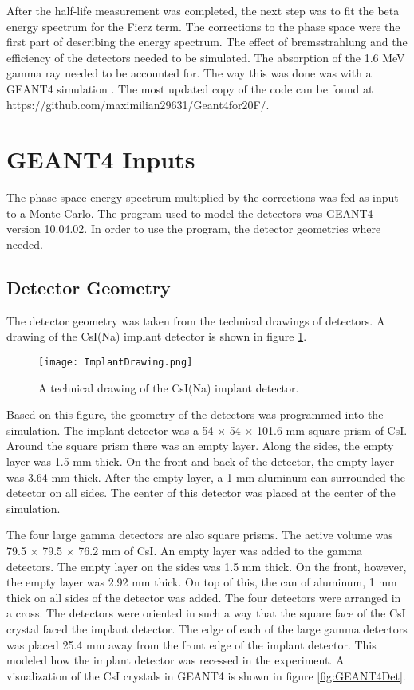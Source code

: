 \documentclass[../MaxHughesThesis.tex]{subfiles}
\begin{document}
After the half-life measurement was completed, the next step was to fit the beta energy spectrum for the Fierz term. 
The corrections to the phase space were the first part of describing the energy spectrum.  
The effect of bremsstrahlung and the efficiency of the detectors needed to be simulated.
The absorption of the 1.6 MeV gamma ray needed to be accounted for. 
The way this was done was with a GEANT4 simulation \cite{Ago03}.
The most updated copy of the code can be found at https://github.com/maximilian29631/Geant4for20F/.


\section{GEANT4 Inputs}
The phase space energy spectrum multiplied by the corrections was fed as input to a Monte Carlo.
The program used to model the detectors was GEANT4 version 10.04.02.
In order to use the program, the detector geometries where needed.

\subsection{Detector Geometry}
The detector geometry was taken from the technical drawings of detectors. 
A drawing of the CsI(Na) implant detector is shown in figure \ref{fig:ImplantTech}.
\begin{figure}[!htb]
	\centerline{\texttt{[image: ImplantDrawing.png]}}
	\caption{A technical drawing of the CsI(Na) implant detector.}
	\label{fig:ImplantTech}
\end{figure}
Based on this figure, the geometry of the detectors was programmed into the simulation.
The implant detector was a 54 $\times$ 54 $\times$ 101.6 mm square prism of CsI.
Around the square prism there was an empty layer.
Along the sides, the empty layer was 1.5 mm thick.
On the front and back of the detector, the empty layer was 3.64 mm thick.
After the empty layer, a 1 mm aluminum can surrounded the detector on all sides.  
The center of this detector was placed at the center of the simulation.

The four large gamma detectors are also square prisms.
The active volume was 79.5 $\times$ 79.5 $\times$ 76.2 mm of CsI.
An empty layer was  added to the gamma detectors.
The empty layer on the sides was 1.5 mm thick.
On the front, however, the empty layer was 2.92 mm thick.
On top of this, the can of aluminum, 1 mm thick on all sides of the detector was added.
The four detectors were arranged in a cross.
The detectors were oriented in such a way that the square face of the CsI crystal faced the implant detector. 
The edge of each of the large gamma detectors was placed 25.4 mm away from the front edge of the implant detector.
This modeled how the implant detector was recessed in the experiment.
A visualization of the CsI crystals in GEANT4 is shown in figure \ref{fig:GEANT4Det}.
\end{document}
